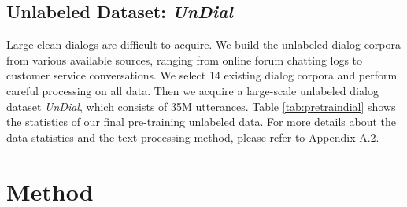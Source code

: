 \documentclass[letterpaper]{article} \usepackage{aaai22}  \usepackage{times}  \usepackage{helvet}  \usepackage{courier}  \usepackage[hyphens]{url}  \usepackage{graphicx} \urlstyle{rm} \def\UrlFont{\rm}  \usepackage{natbib}  \usepackage{caption} \DeclareCaptionStyle{ruled}{labelfont=normalfont,labelsep=colon,strut=off} \frenchspacing  \setlength{\pdfpagewidth}{8.5in}  \setlength{\pdfpageheight}{11in}  \usepackage{algorithm}
\begin{document}
\subsection{Unlabeled Dataset: \textit{UnDial}}
Large clean dialogs are difficult to acquire. We build the unlabeled dialog corpora from various available sources, ranging from online forum chatting logs to customer service conversations. We select 14 existing dialog corpora and perform careful processing on all data. Then we acquire a large-scale unlabeled dialog dataset \textit{UnDial}, which consists of 35M utterances.
Table \ref{tab:pretraindial} shows the statistics of our final pre-training unlabeled data. For more details about the data statistics and the text processing method, please refer to Appendix A.2.










\section{Method}
\end{document}
